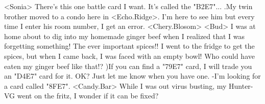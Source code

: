 <Sonia> There's this one battle card I want. It's called the "{B2}{E7}"... 
.My twin brother moved to a condo here in <Echo.Ridge>. 
I'm here to see him but every time I enter his room number, I get an error. 
<Chery.Blosom> 
<Bud> I was at home about to dig into my homemade ginger beef when I 
realized that I was forgetting something! 
The ever important spices!! 
I went to the fridge to get the spices, but when I came back, I was faced 
with an empty bowl! Who could have eaten my ginger beef like that!? 
)If you can find a "{79}{E7}" card, 
I will trade you an "{D4}{E7}" card for it. 
OK? Just let me know when you have one. 
-I'm looking for a card called "{8F}{E7}". 
<Candy.Bar> While I was out virus busting, my Hunter-VG went on the fritz, 
I wonder if it can be fixed? 

